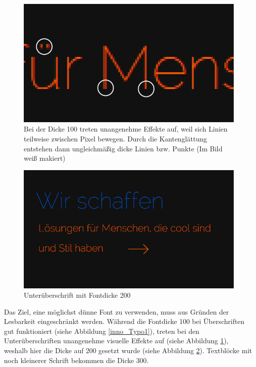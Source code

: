         \begin{figure} [htp]
\includegraphics[width=\textwidth]{./img/inno_typo1_2.png}
\caption{Bei der Dicke 100 treten unangenehme Effekte auf, weil sich Linien teilweise zwischen Pixel bewegen. Durch die Kantenglättung entstehen dann ungleichmäßig dicke Linien bzw. Punkte (Im Bild weiß makiert)}
\label{inno_Typo12}
\end{figure}

\begin{figure} [htp]
\includegraphics[width=\textwidth]{./img/inno_typo2.png}
\caption{Unterüberschrift mit Fontdicke 200}
\label{inno_Typo2}
\end{figure}
Das Ziel, eine möglichst dünne Font zu verwenden, muss aus Gründen der Lesbarkeit eingeschränkt werden. Während die Fontdicke 100 bei Überschriften gut funktioniert (siehe Abbildung \ref{inno_Typo1}), treten bei den Unterüberschriften unangenehme visuelle Effekte auf (siehe Abbildung \ref{inno_Typo12}), weshalb hier die Dicke auf 200 gesetzt wurde (siehe Abbildung \ref{inno_Typo2}). Textblöcke mit noch kleinerer Schrift bekommen die Dicke 300.


